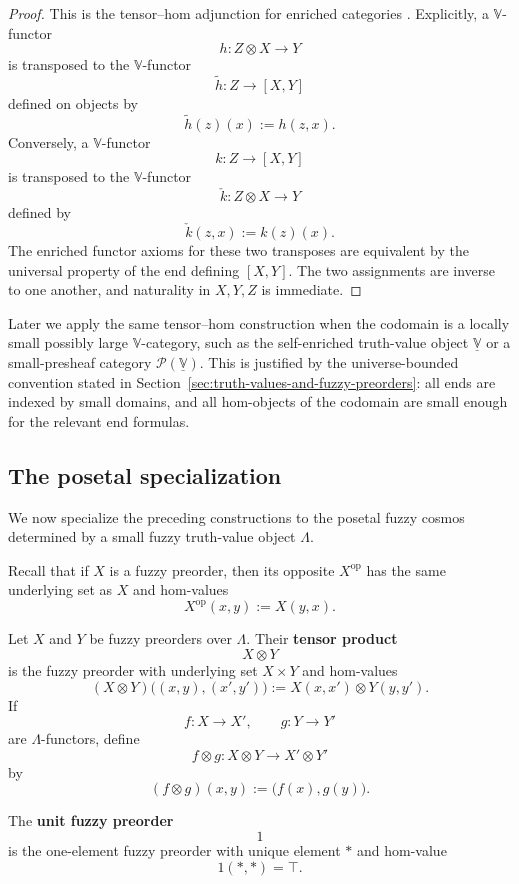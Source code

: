 \begin{proof}
    This is the tensor--hom adjunction for enriched categories \cite[Section~2.3, especially formula~(2.20)]{Kelly1982BasicConcepts}. Explicitly, a \(\mathbb V\)-functor
    \[
        h:Z\otimes X\to Y
    \]
    is transposed to the \(\mathbb V\)-functor
    \[
        \widetilde h:Z\to [X,Y]
    \]
    defined on objects by
    \[
        \widetilde h(z)(x):=h(z,x).
    \]
    Conversely, a \(\mathbb V\)-functor
    \[
        k:Z\to [X,Y]
    \]
    is transposed to the \(\mathbb V\)-functor
    \[
        \check k:Z\otimes X\to Y
    \]
    defined by
    \[
        \check k(z,x):=k(z)(x).
    \]
    The enriched functor axioms for these two transposes are equivalent by the universal property of the end defining \([X,Y]\). The two assignments are inverse to one another, and naturality in \(X,Y,Z\) is immediate.
\end{proof}

\begin{remark}
\label{rem:universe-bounded-tensor-hom-use}
    Later we apply the same tensor--hom construction when the codomain is a locally small possibly large \(\mathbb V\)-category, such as the self-enriched truth-value object \(\underline{\mathbb V}\) or a small-presheaf category \(\mathcal P(\underline{\mathbb V})\). This is justified by the universe-bounded convention stated in Section~\ref{sec:truth-values-and-fuzzy-preorders}: all ends are indexed by small domains, and all hom-objects of the codomain are small enough for the relevant end formulas.
\end{remark}

\subsection{The posetal specialization}
\label{subsec:posetal-specialization-of-tensor-hom}

We now specialize the preceding constructions to the posetal fuzzy cosmos determined by a small fuzzy truth-value object \(\Lambda\).

Recall that if \(X\) is a fuzzy preorder, then its opposite \(X^{\mathrm{op}}\) has the same underlying set as \(X\) and hom-values
\[
    X^{\mathrm{op}}(x,y):=X(y,x).
\]

\begin{definition}
\label{def:tensor-product-and-unit}
    Let \(X\) and \(Y\) be fuzzy preorders over \(\Lambda\). Their \textbf{tensor product}
    \[
        X\otimes Y
    \]
    is the fuzzy preorder with underlying set \(X\times Y\) and hom-values
    \[
        (X\otimes Y)\bigl((x,y),(x',y')\bigr)
        :=
        X(x,x')\otimes Y(y,y').
    \]
    If
    \[
        f:X\to X',
        \qquad
        g:Y\to Y'
    \]
    are \(\Lambda\)-functors, define
    \[
        f\otimes g:X\otimes Y\to X'\otimes Y'
    \]
    by
    \[
        (f\otimes g)(x,y):=\bigl(f(x),g(y)\bigr).
    \]

    The \textbf{unit fuzzy preorder}
    \[
        1
    \]
    is the one-element fuzzy preorder with unique element \(\ast\) and hom-value
    \[
        1(\ast,\ast)=\top.
    \]
\end{definition}


